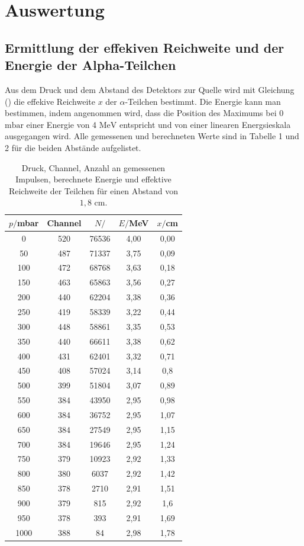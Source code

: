 \section{Auswertung}
\label{sec:Auswertung}

\subsection{Ermittlung der effekiven Reichweite und der Energie der Alpha-Teilchen}
Aus dem Druck und dem Abstand des Detektors zur Quelle wird mit Gleichung () die effekive Reichweite $x$ der $\alpha$-Teilchen bestimmt. 
Die Energie kann man bestimmen, indem angenommen wird, dass die Position des Maximums bei $0$ $\si{\milli\bar}$ einer Energie von 4 $\si{\MeV}$ entspricht und von einer linearen Energsieskala ausgegangen wird.
Alle gemessenen und berechneten Werte sind in Tabelle 1 und 2 für die beiden Abstände aufgelistet.


\begin{table}[H]
  \centering
  \caption{Druck, Channel, Anzahl an gemessenen Impulsen, berechnete Energie und effektive Reichweite der Teilchen für einen Abstand von $1,8$ $\si{\cm}$.}
  \label{tab:Parameter}
  \begin{tabular}{c c c c c}
    \toprule
    $p/$mbar& Channel & $N/$ & $E/$MeV & $x/$cm \\
    \bottomrule
    0 & 520 & 76536 & 4,00 & 0,00 \\
    50 & 487 & 71337 & 3,75 & 0,09 \\
    100 & 472 & 68768 & 3,63 & 0,18 \\
    150 & 463 & 65863 & 3,56 & 0,27 \\
    200 & 440 & 62204 & 3,38 & 0,36 \\
    250 & 419 & 58339 & 3,22 & 0,44 \\
    300 & 448 & 58861 & 3,35 & 0,53 \\
    350 & 440 & 66611 & 3,38 & 0,62 \\
    400 & 431 & 62401 & 3,32 & 0,71 \\
    450 & 408 & 57024 & 3,14 & 0,8 \\
    500 & 399 & 51804 & 3,07 & 0,89 \\
    550 & 384 & 43950 & 2,95 & 0,98 \\
    600 & 384 & 36752 & 2,95 & 1,07 \\
    650 & 384 & 27549 & 2,95 & 1,15 \\
    700 & 384 & 19646 & 2,95 & 1,24 \\
    750 & 379 & 10923 & 2,92 & 1,33 \\
    800 & 380 & 6037 & 2,92 & 1,42 \\
    850 & 378 & 2710 & 2,91 & 1,51 \\
    900 & 379 & 815 & 2,92 & 1,6 \\
    950 & 378 & 393 & 2,91 & 1,69 \\
    1000 & 388 & 84 & 2,98 & 1,78 \\
 
     \bottomrule
  \end{tabular}
\end{table}

